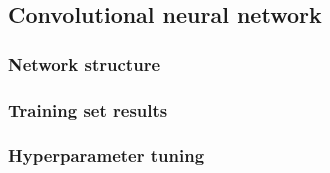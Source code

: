 \subsection{Convolutional neural network}

\subsubsection{Network structure}

\subsubsection{Training set results}

\subsubsection{Hyperparameter tuning}

\newpage